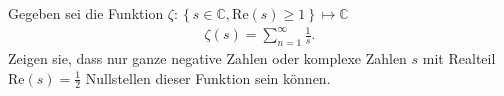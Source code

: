 Gegeben sei die Funktion $\zeta: \left\lbrace s \in \mathbb{C}, \text{Re}(s) \geq 1 \right\rbrace \mapsto \mathbb{C}$
\begin{align*}
    \zeta(s) = \sum_{n= 1}^{\infty} \frac{1}{s}. 
\end{align*}
Zeigen sie, dass nur ganze negative Zahlen oder komplexe Zahlen $s$ mit Realteil $\text{Re}(s) = \frac{1}{2}$ Nullstellen dieser Funktion sein können. 
